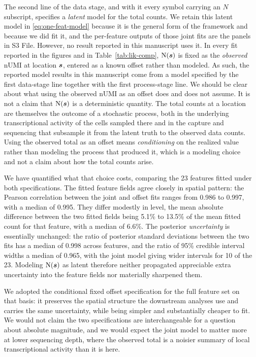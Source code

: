 \documentclass[10pt,letterpaper]{article}
\begin{document}
The second line of the data stage, and with it every symbol carrying an $N$ subscript, specifies a \textit{latent} model for the total counts. We retain this latent model in \eqref{eq:one-feat-model} because it is the general form of the framework and because we did fit it, and the per-feature outputs of those joint fits are the panels in S3 File. However, no result reported in this manuscript uses it. In every fit reported in the figures and in Table~\ref{tab:lik-comp}, $\mbox{N}(\mbox{\boldmath $s$})$ is fixed as the \textit{observed} nUMI at location $\mbox{\boldmath $s$}$, entered as a known offset rather than modeled. As such, the reported model results in this manuscript come from a model specified by the first data-stage line together with the first process-stage line. We should be clear about what using the observed nUMI as an offset does and does not assume. It is not a claim that $\mbox{N}(\mbox{\boldmath $s$})$ is a deterministic quantity. The total counts at a location are themselves the outcome of a stochastic process, both in the underlying transcriptional activity of the cells sampled there and in the capture and sequencing that subsample it from the latent truth to the observed data counts. Using the observed total as an offset means \textit{conditioning} on the realized value rather than modeling the process that produced it, which is a modeling choice and not a claim about how the total counts arise.

We have quantified what that choice costs, comparing the 23 features fitted under both specifications. The fitted feature fields agree closely in spatial pattern: the Pearson correlation between the joint and offset fits ranges from 0.986 to 0.997, with a median of 0.995. They differ modestly in level, the mean absolute difference between the two fitted fields being 5.1\% to 13.5\% of the mean fitted count for that feature, with a median of 6.6\%. The posterior \textit{uncertainty} is essentially unchanged: the ratio of posterior standard deviations between the two fits has a median of 0.998 across features, and the ratio of 95\% credible interval widths a median of 0.965, with the joint model giving wider intervals for 10 of the 23. Modeling $\mbox{N}(\mbox{\boldmath $s$})$ as latent therefore neither propagated appreciable extra uncertainty into the feature fields nor materially sharpened them.

We adopted the conditional fixed offset specification for the full feature set on that basis: it preserves the spatial structure the downstream analyses use and carries the same uncertainty, while being simpler and substantially cheaper to fit. We would not claim the two specifications are interchangeable for a question about absolute magnitude, and we would expect the joint model to matter more at lower sequencing depth, where the observed total is a noisier summary of local transcriptional activity than it is here.
\end{document}
